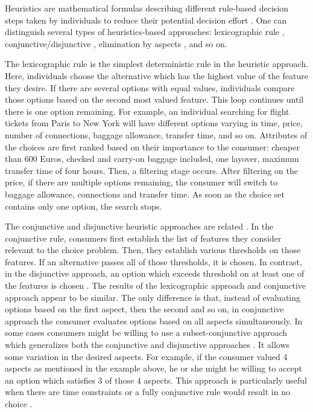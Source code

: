 \documentclass[a4paper,12pt]{article}
\begin{document}
Heuristics are mathematical formulas describing different rule-based decision steps taken by individuals to reduce their potential decision effort \citep{bettman1998constructive}. One can distinguish several types of heuristics-based approaches: lexicographic rule \citep{fishburn74}, conjunctive/disjunctive \citep{coombs1951mathematical}, elimination by aspects \citep{tversky1972elimination}, and so on. 

The lexicographic rule is the simplest deterministic rule in the heuristic approach. Here, individuals choose the alternative which has the highest value of the feature they desire. If there are several options with equal values, individuals compare those options based on the second most valued feature. This loop continues until there is one option remaining. For example, an individual searching for flight tickets from Paris to New York will have different options varying in time, price, number of connections, baggage allowance, transfer time, and so on. Attributes of the choices are first ranked based on their importance to the consumer: cheaper than 600 Euros, checked and carry-on baggage included, one layover, maximum transfer time of four hours. Then, a filtering stage occurs. After filtering on the price, if there are multiple options remaining, the consumer will switch to baggage allowance, connections and transfer time. As soon as the choice set contains only one option, the search stops.

The conjunctive and disjunctive heuristic approaches are related \citep{coombs1951mathematical}. In the conjunctive rule, consumers first establish the list of features they consider relevant to the choice problem. Then, they establish various thresholds on those features. If an alternative passes all of those thresholds, it is chosen. In contrast, in the disjunctive approach, an option which exceeds threshold on at least one of the features is chosen \citep{coombs1951mathematical}. The results of the lexicographic approach and conjunctive approach appear to be similar. The only difference is that, instead of evaluating options based on the first aspect, then the second and so on, in conjunctive approach the consumer evaluates options based on all aspects simultaneously. In some cases consumers might be willing to use a subset-conjunctive approach  which generalizes both the conjunctive and disjunctive approaches \citep{hauser2014consideration}. It allows some variation in the desired aspects. For example, if the consumer valued 4 aspects as mentioned in the example above, he or she might be willing to accept an option which satisfies 3 of those 4 aspects. This approach is particularly useful when there are time constraints or a fully conjunctive rule would result in no choice \citep{hauser2009non}. 
\end{document}
